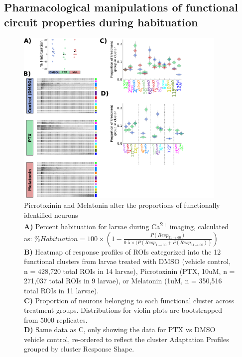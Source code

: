 \documentclass[9pt,lineno]{RandlettLab_elife}
\begin{document}
\subsection{Pharmacological manipulations of functional circuit properties during habituation}

\begin{figure}
\begin{center}
\includegraphics[width=0.9\textwidth]{Figure6 - Ca2+ImagingDrugs.png}
\caption{
Picrotoxinin and Melatonin alter the proportions of functionally identified neurons
\\ \textbf{A)} Percent habituation for larvae during Ca\textsuperscript{2+} imaging, calculated as:
$\% Habituation = 
100 \times (1 - \frac{P(Resp_{31\rightarrow60})}{0.5 \times (P(Resp_{1\rightarrow30} + P(Resp_{31\rightarrow60}))})$
\\ \textbf{B)} Heatmap of response profiles of ROIs categorized into the 12 functional clusters from larvae treated with DMSO (vehicle control, n = 428,720 total ROIs in 14 larvae), Picrotoxinin (PTX, 10uM, n = 271,037 total ROIs in 9 larvae), or Melatonin (1uM, n = 350,516 total ROIs in 11 larvae).
\\ \textbf{C)} Proportion of neurons belonging to each functional cluster across treatment groups. Distributions for violin plots are bootstrapped from 5000 replicates. 
\\ \textbf{D)} Same data as C, only showing the data for PTX vs DMSO vehicle control, re-ordered to reflect the cluster Adaptation Profiles grouped by cluster Response Shape. 
}


\end{center}
\end{figure}
\end{document}

